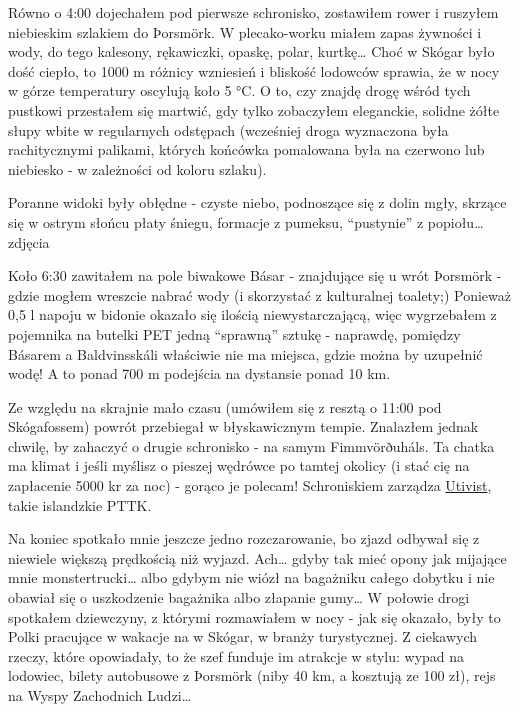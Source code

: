 Równo o 4:00 dojechałem pod pierwsze schronisko, zostawiłem rower i ruszyłem niebieskim szlakiem do Þorsmörk. W plecako-worku miałem zapas żywności i wody, do tego kalesony, rękawiczki, opaskę, polar, kurtkę… Choć w Skógar było dość ciepło, to 1000 m różnicy wzniesień i bliskość lodowców sprawia, że w nocy w górze temperatury oscylują koło 5 °C. O to, czy znajdę drogę wśród tych pustkowi przestałem się martwić, gdy tylko zobaczyłem eleganckie, solidne żółte słupy wbite w regularnych odstępach (wcześniej droga wyznaczona była rachitycznymi palikami, których końcówka pomalowana była na czerwono lub niebiesko - w zależności od koloru szlaku).

Poranne widoki były obłędne - czyste niebo, podnoszące się z dolin mgły, skrzące się w ostrym słońcu płaty śniegu, formacje z pumeksu, “pustynie” z popiołu… {zdjęcia}

Koło 6:30 zawitałem na pole biwakowe Básar - znajdujące się u wrót Þorsmörk - gdzie mogłem wreszcie nabrać wody (i skorzystać z kulturalnej toalety;) Ponieważ 0,5 l napoju w bidonie okazało się ilością niewystarczającą, więc wygrzebałem z pojemnika na butelki PET jedną “sprawną” sztukę - naprawdę, pomiędzy Básarem a Baldvinsskáli właściwie nie ma miejsca, gdzie można by uzupełnić wodę! A to ponad 700 m podejścia na dystansie ponad 10 km.

Ze względu na skrajnie mało czasu (umówiłem się z resztą o 11:00 pod Skógafossem) powrót przebiegał w błyskawicznym tempie. Znalazłem jednak chwilę, by zahaczyć o drugie schronisko - na samym Fimmvörðuháls. Ta chatka ma klimat i jeśli myślisz o pieszej wędrówce po tamtej okolicy (i stać cię na zapłacenie 5000 kr za noc) - gorąco je polecam! Schroniskiem zarządza \href{http://www.utivist.is/english}{Utivist}, takie islandzkie PTTK.

Na koniec spotkało mnie jeszcze jedno rozczarowanie, bo zjazd odbywał się z niewiele większą prędkością niż wyjazd. Ach… gdyby tak mieć opony jak mijające mnie monstertrucki… albo gdybym nie wiózł na bagażniku całego dobytku i nie obawiał się o uszkodzenie bagażnika albo złapanie gumy… W połowie drogi spotkałem dziewczyny, z którymi rozmawiałem w nocy - jak się okazało, były to Polki pracujące w wakacje na w Skógar, w branży turystycznej. Z ciekawych rzeczy, które opowiadały, to że szef funduje im atrakcje w stylu: wypad na lodowiec, bilety autobusowe z Þorsmörk (niby 40 km, a kosztują ze 100 zł), rejs na Wyspy Zachodnich Ludzi…


